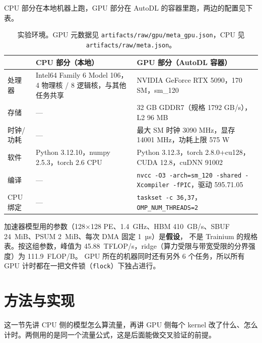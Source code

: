 \documentclass[11pt,a4paper]{ctexart}
\begin{document}
CPU 部分在本地机器上跑，GPU 部分在 AutoDL 的容器里跑，两边的配置见下表。

\begin{table}[H]
\centering\small
\begin{tabularx}{\linewidth}{lXX}
\toprule
 & CPU 部分（本地） & GPU 部分（AutoDL 容器） \\
\midrule
处理器 & Intel64 Family 6 Model 106，4 物理核 / 8 逻辑核，与其他任务共享 & NVIDIA GeForce RTX 5090，170 SM，sm\_120 \\
存储 & — & 32 GB GDDR7（规格 1792 GB/s），L2 96 MB \\
时钟/功耗 & — & 最大 SM 时钟 3090 MHz，显存 14001 MHz，功耗上限 575 W \\
软件 & Python 3.12.10，numpy 2.5.3，torch 2.6 CPU & Python 3.12.3，torch 2.8.0+cu128，CUDA 12.8，cuDNN 91002 \\
编译 & — & \texttt{nvcc -O3 -arch=sm\_120 -shared -Xcompiler -fPIC}，驱动 595.71.05 \\
CPU 绑定 & — & \texttt{taskset -c 36,37}，\texttt{OMP\_NUM\_THREADS=2} \\
\bottomrule
\end{tabularx}
\caption{实验环境。GPU 元数据见 \texttt{artifacts/raw/gpu/meta\_gpu.json}，CPU 见 \texttt{artifacts/raw/meta.json}。}
\end{table}

加速器模型用的参数（128$\times$128 PE、1.4~GHz、HBM 410~GB/s、SBUF 24~MiB、PSUM 2~MiB、每次 DMA 固定 1~µs）是\textbf{假设}，
不是 Trainium 的规格表。按这组参数，峰值为 45.88~TFLOP/s，ridge（算力受限与带宽受限的分界强度）为 111.9~FLOP/B。
GPU 所在的机器同时还有另外 6 个任务，所以所有 GPU 计时都在一把文件锁（\texttt{flock}）下独占进行。

\section{方法与实现}

这一节先讲 CPU 侧的模型怎么算流量，再讲 GPU 侧每个 kernel 改了什么、怎么计时。两侧用的是同一个流量公式，这是后面能做交叉验证的前提。
\end{document}
